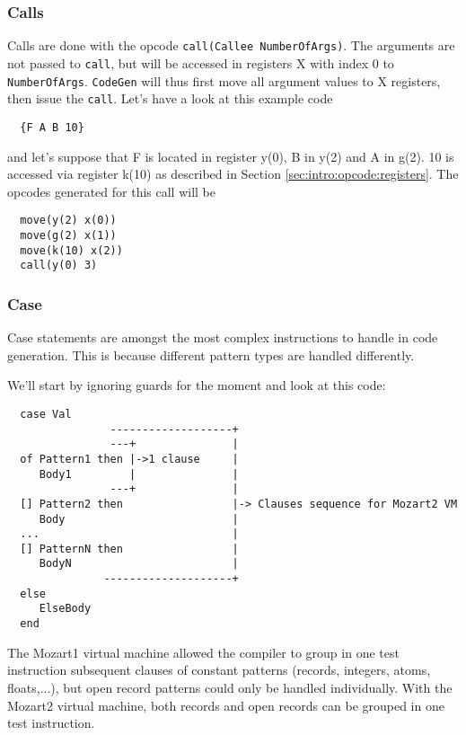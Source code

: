 \documentclass[a4paper]{memoir}
\begin{document}
\subsubsection{Calls}\label{sec:codegen:calls}
Calls are done with the opcode \lstinline!call(Callee NumberOfArgs)!. The arguments are not passed to \lstinline!call!, but will be accessed in registers X with index 0 to \lstinline!NumberOfArgs!. \lstinline!CodeGen! will thus first move all argument values to X registers, then issue the \lstinline!call!.
Let's have a look at this example code
\begin{lstlisting}
  {F A B 10}
\end{lstlisting}
and let's suppose that F is located in register y(0), B in y(2)  and A in g(2). 10 is accessed via register k(10) as described in Section \ref{sec:intro:opcode:registers}.
The opcodes generated for this call will be 
\begin{lstlisting}
  move(y(2) x(0))
  move(g(2) x(1))
  move(k(10) x(2))
  call(y(0) 3)
\end{lstlisting}

\subsubsection{Case}
Case statements are amongst the most complex instructions to handle in code generation. This is because different pattern types are handled differently. 


We'll start by ignoring guards for the moment and look at this code:

\begin{verbatim}
  case Val
                -------------------+
                ---+               |
  of Pattern1 then |->1 clause     |
     Body1         |               |
                ---+               |
  [] Pattern2 then                 |-> Clauses sequence for Mozart2 VM
     Body                          |
  ...                              |
  [] PatternN then                 |
     BodyN                         |
               --------------------+
  else
     ElseBody
  end

\end{verbatim}

The Mozart1 virtual machine allowed the compiler to group in one test instruction subsequent clauses of
constant patterns (records, integers, atoms, floats,...), but open
record patterns could only be handled individually.
With the Mozart2 virtual machine, both records and open records can be grouped in one test instruction.
\end{document}
